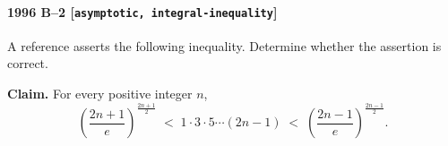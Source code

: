 \paragraph{1996 B--2 \textnormal{[\texttt{asymptotic, integral-inequality}]}}
A reference asserts the following inequality. Determine whether the
assertion is correct.

\textbf{Claim.} For every positive integer $n$,
\[
\left( \frac{2n+1}{e} \right)^{\frac{2n+1}{2}} \;<\;
1 \cdot 3 \cdot 5 \cdots (2n-1) \;<\;
\left( \frac{2n-1}{e} \right)^{\frac{2n-1}{2}}.
\]
